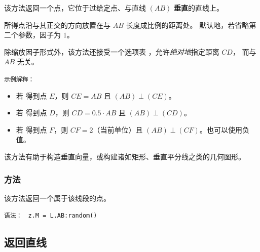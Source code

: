 该方法返回一个点，它位于过给定点、与直线 $(AB)$ \textbf{垂直}的直线上。

所得点沿与其正交的方向放置在与 $AB$ 长度成比例的距离处。
默认地，若省略第二个参数，因子为 $1$。

\medskip
除缩放因子形式外，该方法还接受一个选项表
，允许\emph{绝对地}指定距离 $CD$，
而与 $AB$ 无关。

\medskip

\texttt{示例解释：}
\begin{itemize}
  \item 若  得到点 $E$，则 $CE = AB$ 且 $(AB) \perp (CE)$。
  \item 若  得到点 $D$，则 $CD = 0.5 \cdot AB$ 且 $(AB) \perp (CD)$。
  \item 若  得到点 $F$，则 $CF = 2$（当前单位）且 $(AB) \perp (CF)$。也可以使用负值。
\end{itemize}

该方法有助于构造垂直向量，或构建诸如矩形、垂直平分线之类的几何图形。

\vspace{1em}
\begin{tkzexample}[latex =.5\textwidth]
\begin{center}
\end{center}
\end{tkzexample}



\subsubsection{方法 }
\label{ssub:method_line_random}
该方法返回一个属于该线段的点。

\medskip
\texttt{语法： } \verb|z.M = L.AB:random()|


\subsection{返回直线}


